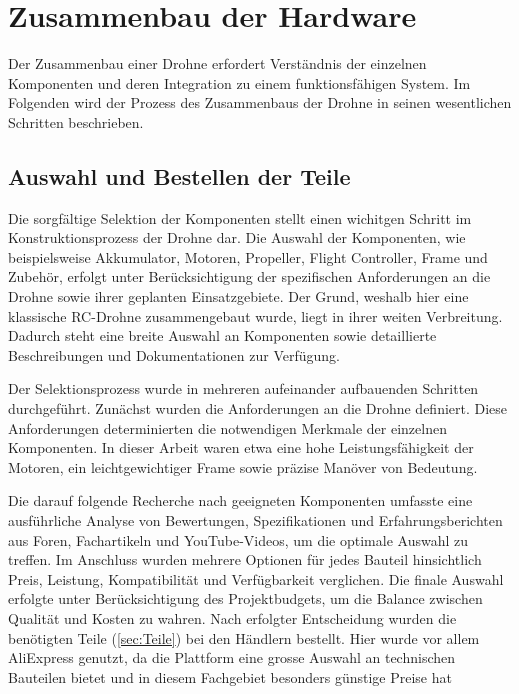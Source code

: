 \chapter{Zusammenbau der Hardware} \label{ch:ZusammenbauDrohne}
Der Zusammenbau einer Drohne erfordert Verständnis der einzelnen Komponenten und deren Integration zu einem funktionsfähigen System. Im Folgenden wird der Prozess des Zusammenbaus der Drohne in seinen wesentlichen Schritten beschrieben.

\section{Auswahl und Bestellen der Teile}
Die sorgfältige Selektion der Komponenten stellt einen wichitgen Schritt im Konstruktionsprozess der Drohne dar. Die Auswahl der Komponenten, wie beispielsweise Akkumulator, Motoren, Propeller, Flight Controller, Frame und Zubehör, erfolgt unter Berücksichtigung der spezifischen Anforderungen an die Drohne sowie ihrer geplanten Einsatzgebiete. Der Grund, weshalb hier eine klassische RC-Drohne zusammengebaut wurde, liegt in ihrer weiten Verbreitung. Dadurch steht eine breite Auswahl an Komponenten sowie detaillierte Beschreibungen und Dokumentationen zur Verfügung.

Der Selektionsprozess wurde in mehreren aufeinander aufbauenden Schritten durchgeführt. Zunächst wurden die Anforderungen an die Drohne definiert. Diese Anforderungen determinierten die notwendigen Merkmale der einzelnen Komponenten. In dieser Arbeit waren etwa eine hohe Leistungsfähigkeit der Motoren, ein leichtgewichtiger Frame sowie präzise Manöver von Bedeutung.
  
Die darauf folgende Recherche nach geeigneten Komponenten umfasste eine ausführliche Analyse von Bewertungen, Spezifikationen und Erfahrungsberichten aus Foren, Fachartikeln und YouTube-Videos, um die optimale Auswahl zu treffen. Im Anschluss wurden mehrere Optionen für jedes Bauteil hinsichtlich Preis, Leistung, Kompatibilität und Verfügbarkeit verglichen. Die finale Auswahl erfolgte unter Berücksichtigung des Projektbudgets, um die Balance zwischen Qualität und Kosten zu wahren. Nach erfolgter Entscheidung wurden die benötigten Teile (\autoref{sec:Teile}) bei den Händlern bestellt. Hier wurde vor allem AliExpress genutzt, da die Plattform eine grosse Auswahl an technischen Bauteilen bietet und in diesem Fachgebiet besonders günstige Preise hat

